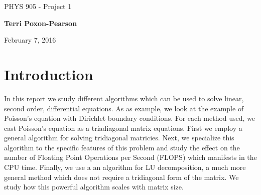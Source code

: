 \documentclass[%
oneside,                 %
final,                   %
10pt]{article}
\begin{document}

\newcommand{\exercisesection}[1]{\subsection*{#1}}






\thispagestyle{empty}

\begin{center}
{\LARGE\bf
\begin{spacing}{1.25}
PHYS 905 - Project 1
\end{spacing}
}
\end{center}


\begin{center}
{\bf Terri Poxon-Pearson}
\end{center}

    

\begin{center}
February 7, 2016
\end{center}

\vspace{1cm}

\tableofcontents
 
\section{Introduction}
In this report we study different algorithms which can be used to solve linear, second order, differential equations.  As as example, we look at the example of Poisson's equation with Dirichlet boundary conditions.  For each method used, we cast Poisson's equation as a triadiagonal matrix equations.  First we employ a general algorithm for solving tridiagonal matricies.  Next, we specialize this algorithm to the specific features of this problem and study the effect on the number of Floating Point Operations per Second (FLOPS) which manifests in the CPU time.  Finally, we use a an algorithm for LU decomposition, a much more general method which does not require a tridiagonal form of the matrix.  We study how this powerful algorithm scales with matrix size.
\end{document}
